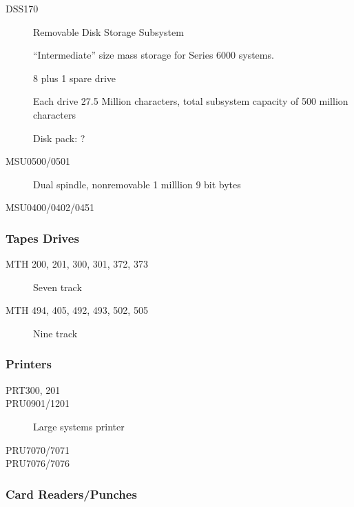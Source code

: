 \documentclass[notitlepage]{report}
\begin{document}
\begin{description}
        \item[DSS170] Removable Disk Storage Subsystem 

“Intermediate” size mass storage for Series 6000 systems.

8 plus 1 spare drive

Each drive 27.5 Million characters, total subsystem capacity of 500 million 
characters

Disk pack: ?

        \item[MSU0500/0501]

Dual spindle, nonremovable 1 milllion 9 bit bytes

        \item[MSU0400/0402/0451]

    \end{description} %

\subsubsection{Tapes Drives}

    \begin{description}

        \item[MTH 200, 201, 300, 301, 372, 373] Seven track
        \item[MTH 494, 405, 492, 493, 502, 505] Nine track

    \end{description} %

\subsubsection{Printers}

    \begin{description}

        \item[PRT300, 201]
        \item[PRU0901/1201] Large systems printer
        \item[PRU7070/7071]
        \item[PRU7076/7076]

    \end{description} %

\subsubsection{Card Readers/Punches}
\end{document}
